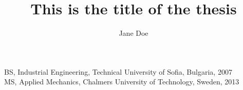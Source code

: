 
\title{This is the title of the thesis}

\author{Jane Doe}

\prevdegrees
{
    BS, Industrial Engineering, Technical University of Sofia, Bulgaria, 2007
    \\
    MS, Applied Mechanics, Chalmers University of Technology, Sweden, 2013
}





\thesisdate{\today}

\frontmatter

\maketitle
